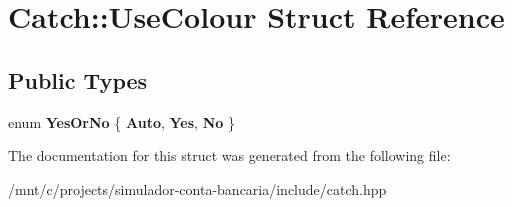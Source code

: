 \hypertarget{structCatch_1_1UseColour}{}\section{Catch\+:\+:Use\+Colour Struct Reference}
\label{structCatch_1_1UseColour}
\subsection*{Public Types}
\begin{DoxyCompactItemize}
\item 
\mbox{\label{structCatch_1_1UseColour_a6aa78da0c2de7539bb9e3757e204a3f1}} 
enum {\bfseries Yes\+Or\+No} \{ {\bfseries Auto}, 
{\bfseries Yes}, 
{\bfseries No}
 \}
\end{DoxyCompactItemize}


The documentation for this struct was generated from the following file\+:\begin{DoxyCompactItemize}
\item 
/mnt/c/projects/simulador-\/conta-\/bancaria/include/catch.\+hpp\end{DoxyCompactItemize}
